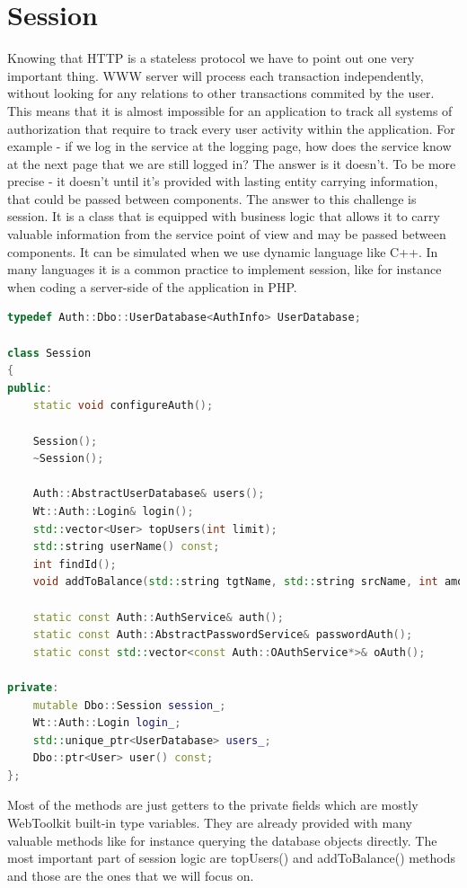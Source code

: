 \documentclass[a4paper,12pt]{book}
\begin{document}
\section{Session}
{
Knowing that HTTP is a stateless protocol we have to point out one very important thing. WWW server will process each transaction independently, without looking for any relations to other transactions commited by the user. This means that it is almost impossible for an application to track all systems of authorization that require to track every user activity within the application. For example - if we log in the service at the logging page, how does the service know at the next page that we are still logged in? The answer is it doesn't. To be more precise - it doesn't until it's provided with lasting entity carrying information, that could be passed between components. The answer to this challenge is session. It is a class that is equipped with business logic that allows it to carry valuable information from the service point of view and may be passed between components. It can be simulated when we use dynamic language like C++. In many languages it is a common practice to implement session, like for instance when coding a server-side of the application in PHP. 

\bigskip
\begin{lstlisting}[frame=single, basicstyle=\small, language=C++, caption={Session.h file.}, captionpos=b]
typedef Auth::Dbo::UserDatabase<AuthInfo> UserDatabase;

class Session
{
public:
	static void configureAuth();

	Session();
	~Session();

	Auth::AbstractUserDatabase& users();
	Wt::Auth::Login& login();
	std::vector<User> topUsers(int limit);
	std::string userName() const;
	int findId();
	void addToBalance(std::string tgtName, std::string srcName, int amount);

	static const Auth::AuthService& auth();
	static const Auth::AbstractPasswordService& passwordAuth();
	static const std::vector<const Auth::OAuthService*>& oAuth();

private:
	mutable Dbo::Session session_;
	Wt::Auth::Login login_;
	std::unique_ptr<UserDatabase> users_;
	Dbo::ptr<User> user() const;
};
\end{lstlisting}

Most of the methods are just getters to the private fields which are mostly WebToolkit built-in type variables. They are already provided with many valuable methods like for instance querying the database objects directly. The most important part of session logic are topUsers() and addToBalance() methods and those are the ones that we will focus on. 
}
\end{document}

